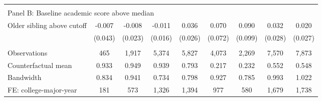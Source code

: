 {{\begin{tabular}{lcccccccc}
&  &  &  & & & & & &    \\
\multicolumn{9}{l}{Panel B: Baseline academic score above median} \\
Older sibling above cutoff&      -0.007   &      -0.008   &      -0.011   &       0.036   &       0.070   &       0.090   &       0.032   &       0.020   \\
                    &     (0.043)   &     (0.023)   &     (0.016)   &     (0.026)   &     (0.072)   &     (0.099)   &     (0.028)   &     (0.027)   \\
                    &               &               &               &               &               &               &               &               \\
Observations        &         465   &       1,917   &       5,374   &       5,827   &       4,073   &       2,269   &       7,570   &       7,873   \\
Counterfactual mean &       0.933   &       0.949   &       0.939   &       0.793   &       0.217   &       0.232   &       0.552   &       0.548   \\
Bandwidth           &       0.834   &       0.941   &       0.734   &       0.798   &       0.927   &       0.785   &       0.993   &       1.022   \\
FE: college-major-year&         181   &         573   &       1,326   &       1,394   &         977   &         580   &       1,679   &       1,738   \\
 

\bottomrule
\end{tabular}
}
}
